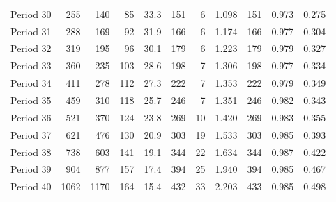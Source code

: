 \documentclass{article}
\theoremstyle{definition}
\begin{document}
\begin{table}[!hbtp]
{\begin{tabular}{lrrrrrrrrrr}
            Period 30 &      255 &      140 &                85 &              33.3 &                     151 &                          6 &       1.098 &            151 &       0.973 &             0.275 \\
            Period 31 &      288 &      169 &                92 &              31.9 &                     166 &                          6 &       1.174 &            166 &       0.977 &             0.304 \\
            Period 32 &      319 &      195 &                96 &              30.1 &                     179 &                          6 &       1.223 &            179 &       0.979 &             0.327 \\
            Period 33 &      360 &      235 &               103 &              28.6 &                     198 &                          7 &       1.306 &            198 &       0.977 &             0.334 \\
            Period 34 &      411 &      278 &               112 &              27.3 &                     222 &                          7 &       1.353 &            222 &       0.979 &             0.349 \\
            Period 35 &      459 &      310 &               118 &              25.7 &                     246 &                          7 &       1.351 &            246 &       0.982 &             0.343 \\
            Period 36 &      521 &      370 &               124 &              23.8 &                     269 &                         10 &       1.420 &            269 &       0.983 &             0.355 \\
            Period 37 &      621 &      476 &               130 &              20.9 &                     303 &                         19 &       1.533 &            303 &       0.985 &             0.393 \\
            Period 38 &      738 &      603 &               141 &              19.1 &                     344 &                         22 &       1.634 &            344 &       0.987 &             0.422 \\
            Period 39 &      904 &      877 &               157 &              17.4 &                     394 &                         25 &       1.940 &            394 &       0.985 &             0.467 \\
            Period 40 &     1062 &     1170 &               164 &              15.4 &                     432 &                         33 &       2.203 &            433 &       0.985 &             0.498 \\

\end{tabular}}
\end{table}
\end{document}
